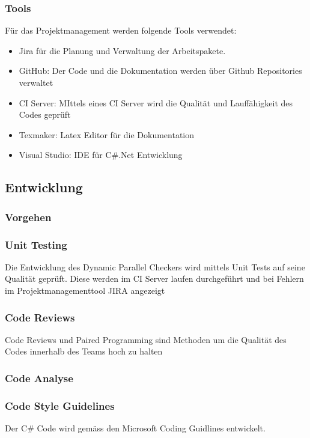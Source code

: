 \documentclass[10pt,a4paper]{article}
\begin{document}
\subsubsection{Tools}
Für das Projektmanagement werden folgende Tools verwendet:
\begin{itemize}
\item Jira für die Planung und Verwaltung der Arbeitspakete.
\item GitHub: Der Code und die Dokumentation werden über Github Repositories verwaltet
\item CI Server: MIttels eines CI Server wird die Qualität und Lauffähigkeit des Codes geprüft
\item Texmaker: Latex Editor für die Dokumentation
\item Visual Studio: IDE für C#.Net Entwicklung
\end{itemize}
\subsection{Entwicklung}
\subsubsection{Vorgehen}
\subsubsection{Unit Testing}
Die Entwicklung des Dynamic Parallel Checkers wird mittels Unit Tests auf seine Qualität geprüft. Diese werden im CI Server laufen durchgeführt und bei Fehlern im Projektmanagementtool JIRA angezeigt
\subsubsection{Code Reviews}
Code Reviews und Paired Programming sind Methoden um die Qualität des Codes innerhalb des Teams hoch zu halten
\subsubsection{Code Analyse}

\subsubsection{Code Style Guidelines}
Der C# Code wird gemäss den Microsoft Coding Guidlines entwickelt.
\end{document}
